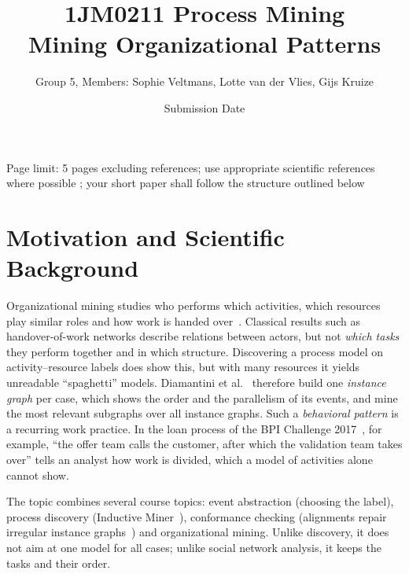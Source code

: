 \documentclass{article}
\title{1JM0211 Process Mining \\Mining Organizational Patterns}
\author{Group 5, Members: Sophie Veltmans, Lotte van der Vlies, Gijs Kruize}
\date{Submission Date}
\begin{document}
\pagestyle{empty}
\let\svmaketitle\maketitle
\def\maketitle{\svmaketitle\thispagestyle{empty}}
\maketitle

\begin{mybox}[frametitle = Remarks (to be removed upon submission)]
Page limit: 5 pages excluding references; use appropriate scientific references where possible \cite{DBLP:books/sp/Aalst16}; your short paper shall follow the structure outlined below
\end{mybox}


\section{Motivation and Scientific Background}\label{sec:motivation}
Organizational mining studies who performs which activities, which resources
play similar roles and how work is handed over~\cite{song2008organizational,
vanderaalst2005social}. Classical results such as handover-of-work networks
describe relations between actors, but not \emph{which tasks} they perform
together and in which structure. Discovering a process model on
activity--resource labels does show this, but with many resources it yields
unreadable ``spaghetti'' models. Diamantini et al.~\cite{diamantini2016behavioral}
therefore build one \emph{instance graph} per case, which shows the order and
the parallelism of its events, and mine the most relevant subgraphs over all
instance graphs. Such a \emph{behavioral pattern} is a recurring work practice.
In the loan process of the BPI Challenge 2017~\cite{vandongen2017bpi}, for
example, ``the offer team calls the customer, after which the validation team
takes over'' tells an analyst how work is divided, which a model of activities
alone cannot show.

The topic combines several course topics: event abstraction (choosing the
label), process discovery (Inductive Miner~\cite{leemans2014infrequent}),
conformance checking (alignments repair irregular instance
graphs~\cite{diamantini2016big,adriansyah2011alignments}) and organizational
mining. Unlike discovery, it does not aim at one model for all cases; unlike
social network analysis, it keeps the tasks and their order.
\end{document}
